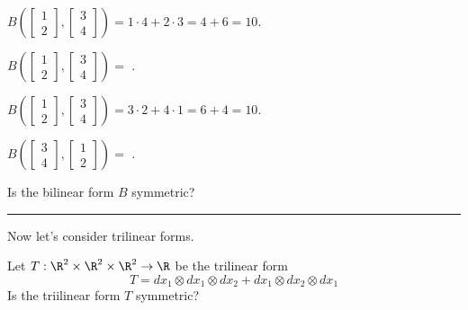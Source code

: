 \documentclass{ximera}
\begin{document}
\begin{question}
\begin{solution}
\begin{hint}
    \end{hint}
    \begin{hint}
      $B \left( \begin{bmatrix} 1 \\ 2 \end{bmatrix}, \begin{bmatrix} 3 \\ 4 \end{bmatrix} \right) = 1 \cdot 4 + 2 \cdot 3 = 4 + 6 = 10$.
    \end{hint}

    $B \left( \begin{bmatrix} 1 \\ 2 \end{bmatrix}, \begin{bmatrix} 3 \\ 4 \end{bmatrix} \right) = $ .
  \end{solution}

  \begin{solution}
    \begin{hint}
      $B \left( \begin{bmatrix} 1 \\ 2 \end{bmatrix}, \begin{bmatrix} 3 \\ 4 \end{bmatrix} \right) = 3 \cdot 2 + 4 \cdot 1 = 6 + 4 = 10.$
    \end{hint}

    $B \left( \begin{bmatrix} 3 \\ 4 \end{bmatrix}, \begin{bmatrix} 1 \\ 2 \end{bmatrix} \right) = $ .
  \end{solution}

  Is the bilinear form $B$ symmetric?
  \begin{solution}
    \begin{multiple-choice}
    \end{multiple-choice}
  \end{solution}

  \hrule

  Now let's consider trilinear forms.

  Let $T : \R^2 \times \R^2 \times \R^2 \to \R$ be the trilinear form
  $$
  T = dx_1 \otimes dx_1 \otimes dx_2 + dx_1 \otimes dx_2 \otimes dx_1
  $$
  Is the triilinear form $T$ symmetric?
  \begin{solution}
    \begin{multiple-choice}
    \end{multiple-choice}
  \end{solution}  


\end{question}
\end{document}
